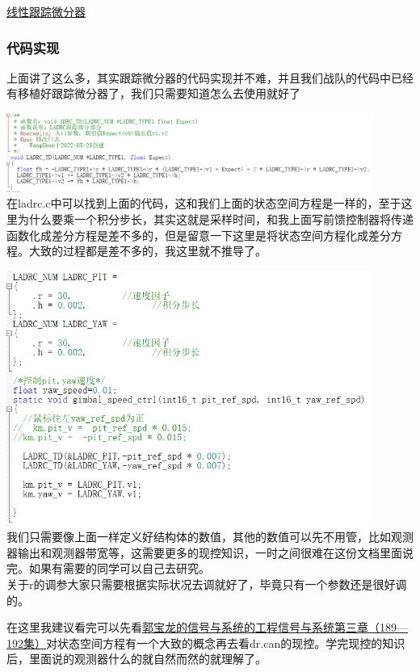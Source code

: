 \documentclass[UTF8,a4paper,12pt]{ctexart}
\begin{document}
          \href{https://blog.csdn.net/weiequest_misc=&request_id=&biz_id=102&utm_term=%E8%B7%9F%E8%B8%AA%E5%BE%AE%E5%88%86%E5%99%A8&utm_medium=distribute.pc_search_result.none-task-blog-2~all~sobaiduweb~default-3-124520209.142^v101^pc_search_result_base1&spm=1018.2226.3001.4187}{线性跟踪微分器}


          \subsubsection{代码实现}
          上面讲了这么多，其实跟踪微分器的代码实现并不难，并且我们战队的代码中已经有移植好跟踪微分器了，我们只需要知道怎么去使用就好了
            \par \includegraphics[width=12cm]{picture/tracking_differentiator_code.png}
              \\在ladrc.c中可以找到上面的代码，这和我们上面的状态空间方程是一样的，至于这里为什么要乘一个积分步长，其实这就是采样时间，和我上面写前馈控制器将传递函数化成差分方程是差不多的，但是留意一下这里是将状态空间方程化成差分方程。大致的过程都是差不多的，我这里就不推导了。
            \par \includegraphics[width=12cm]{picture/tracking_differentiator_code_expng.png}\\
              我们只需要像上面一样定义好结构体的数值，其他的数值可以先不用管，比如观测器输出和观测器带宽等，这需要更多的现控知识，一时之间很难在这份文档里面说完。如果有需要的同学可以自己去研究。\\
              关于r的调参大家只需要根据实际状况去调就好了，毕竟只有一个参数还是很好调的。
              \begin{flushleft}
                在这里我建议看完可以先看\href{https://www.bilibili.com/video/BV1PZ4y1t7DA?spm_id_from=333.788.videopod.episodes&vd_source=b02f21f21dd17ebeef8dac9338c9d06c&p=192}{郭宝龙的信号与系统的工程信号与系统第三章（189—192集）}对状态空间方程有一个大致的概念再去看dr.can的现控。学完现控的知识后，里面说的观测器什么的就自然而然的就理解了。
              \end{flushleft}
              
\end{document}
